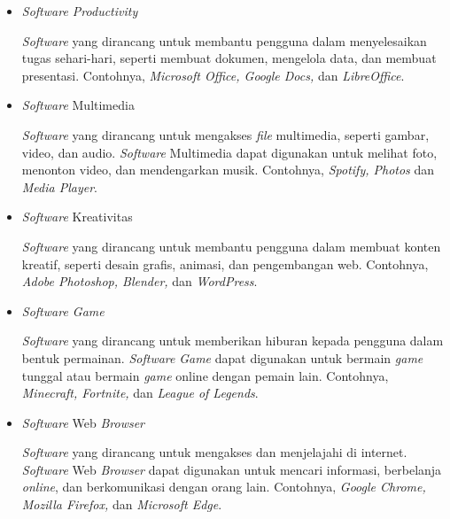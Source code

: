 \documentclass[12pt]{article}
\begin{document}
\begin{itemize}
\begin{enumerate}
            \begin{itemize}
                \item \textit{Software Productivity}
                \par
                \textit{Software} yang dirancang untuk membantu pengguna dalam menyelesaikan tugas sehari-hari, seperti membuat dokumen, mengelola data, dan membuat presentasi. Contohnya, \textit{Microsoft Office, Google Docs,} dan \textit{LibreOffice}.
                \item \textit{Software} Multimedia
                \par
                \textit{Software} yang dirancang untuk mengakses \textit{file} multimedia, seperti gambar, video, dan audio. \textit{Software} Multimedia dapat digunakan untuk melihat foto, menonton video, dan mendengarkan musik. Contohnya, \textit{Spotify, Photos} dan \textit{Media Player}.
                \item \textit{Software} Kreativitas
                \par
                \textit{Software} yang dirancang untuk membantu pengguna dalam membuat konten kreatif, seperti desain grafis, animasi, dan pengembangan web. Contohnya, \textit{Adobe Photoshop, Blender,} dan \textit{WordPress}.
                \item \textit{Software Game}
                \par
                \textit{Software} yang dirancang untuk memberikan hiburan kepada pengguna dalam bentuk permainan. \textit{Software} \textit{Game} dapat digunakan untuk bermain \textit{game} tunggal atau bermain \textit{game} online dengan pemain lain. Contohnya, \textit{Minecraft, Fortnite,} dan \textit{League of Legends}.
                \item \textit{Software} Web \textit{Browser}
                \par
                \textit{Software} yang dirancang untuk mengakses dan menjelajahi di internet. \textit{Software} Web \textit{Browser} dapat digunakan untuk mencari informasi, berbelanja \textit{online}, dan berkomunikasi dengan orang lain. Contohnya, \textit{Google Chrome, Mozilla Firefox,} dan \textit{Microsoft Edge}.
            \end{itemize}
        \end{enumerate}


\end{itemize}
\end{document}
